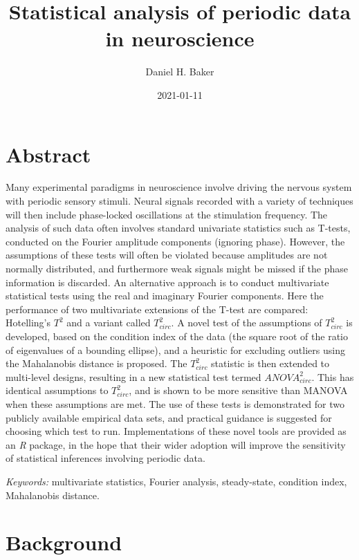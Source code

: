 \documentclass[]{article}
\title{Statistical analysis of periodic data in neuroscience}
\author{Daniel H. Baker}
\date{2021-01-11}
\begin{document}
\maketitle

\hypertarget{abstract}{%
\section{Abstract}\label{abstract}}

Many experimental paradigms in neuroscience involve driving the nervous system with periodic sensory stimuli. Neural signals recorded with a variety of techniques will then include phase-locked oscillations at the stimulation frequency. The analysis of such data often involves standard univariate statistics such as T-tests, conducted on the Fourier amplitude components (ignoring phase). However, the assumptions of these tests will often be violated because amplitudes are not normally distributed, and furthermore weak signals might be missed if the phase information is discarded. An alternative approach is to conduct multivariate statistical tests using the real and imaginary Fourier components. Here the performance of two multivariate extensions of the T-test are compared: Hotelling's \(T^2\) and a variant called \(T^2_{circ}\). A novel test of the assumptions of \(T^2_{circ}\) is developed, based on the condition index of the data (the square root of the ratio of eigenvalues of a bounding ellipse), and a heuristic for excluding outliers using the Mahalanobis distance is proposed. The \(T^2_{circ}\) statistic is then extended to multi-level designs, resulting in a new statistical test termed \(ANOVA^2_{circ}\). This has identical assumptions to \(T^2_{circ}\), and is shown to be more sensitive than MANOVA when these assumptions are met. The use of these tests is demonstrated for two publicly available empirical data sets, and practical guidance is suggested for choosing which test to run. Implementations of these novel tools are provided as an \emph{R} package, in the hope that their wider adoption will improve the sensitivity of statistical inferences involving periodic data.

\emph{Keywords:} multivariate statistics, Fourier analysis, steady-state, condition index, Mahalanobis distance.

\hypertarget{background}{%
\section{Background}\label{background}}
\end{document}
